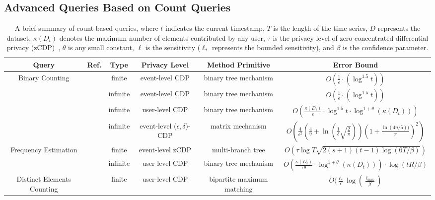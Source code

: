 \subsection{Advanced Queries Based on Count Queries}
 \begin{table}[h]
	\renewcommand\arraystretch{1.5}
	\scriptsize
	\begin{tabular}{cccccc}%
		\toprule %
		\textbf{Query}&\textbf{Ref.} & \textbf{Type}&\textbf{Privacy Level}  & \textbf{Method Primitive}& \textbf{Error Bound} \\ %
		\midrule %
		\multirow{4}{*}{\parbox{3.2cm}{Binary  Counting}}&\cite{dwork2010differential} & finite  &event-level CDP & binary tree mechanism & $O(\frac{1}{\epsilon}\cdot (\log^{1.5}t))$\\
		&\cite{chan2011private}&infinite &event-level CDP & binary tree mechanism & $O(\frac{1}{\epsilon}\cdot (\log^{1.5}t))$\\
		&\cite{dong2023continual} & infinite  &user-level CDP & binary tree mechanism & $O(\frac{\kappa(D_t)}{\epsilon}\cdot \log^{1.5}t\cdot \log^{1+\theta}(\kappa(D_t)))$ \\
		&\cite{henzinger2023almost}  & infinite  & event-level ($\epsilon, \delta$)-CDP& matrix mechanism & $O(\frac{4}{\epsilon^2}(\frac{4}{9}+\ln (\frac{1}{\delta}\sqrt{\frac{2}{\pi}}))(1+\frac{\ln(4n/5))}{\pi})^2)$ \\
		\hline
		\multirow{2}{*}{\parbox{3.2cm}{Frequency Estimation}}& ~\cite{cardoso2022differentially} & finite & event-level zCDP & multi-branch tree& $O(\tau\log T\sqrt{2(s+1)(t-1)\log(6T/\beta)})$\\
		&\cite{dong2023continual} & infinite  &user-level CDP & binary tree mechanism & $O(\frac{\kappa(D_t)}{\epsilon\theta}\cdot \log^{1+\theta}(\kappa(D_t)))\cdot \log(tR/\beta)$ \\
		\hline
		\multirow{1}{*}{\parbox{3.2cm}{Distinct Elements Counting}}&\cite{knop2023counting} & finite  &user-level CDP & bipartite maximum matching & $O(\frac{\ell_*}{\epsilon}\log(\frac{\ell_{\max}}{\beta})$\\
		\bottomrule %
	\end{tabular}
	\caption{A brief summary of count-based queries, where $t$ indicates the current timestamp, $T$ is the length of the time series, $D$ represents the dataset, $\kappa(D_t)$ denotes the maximum number of elements contributed by any user, $\tau$ is the privacy level of zero-concentrated differential privacy (zCDP)~\cite{bun2016concentrated}, $\theta$ is any small constant, $\ell$ is the sensitivity ($\ell_*$ represents the bounded sensitivity), and $\beta$ is the confidence parameter. }
	\label{count_query}
\end{table}
